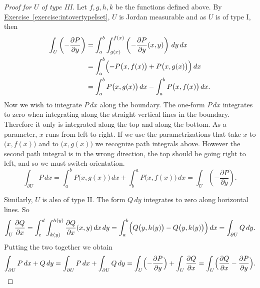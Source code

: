 \documentclass[12pt]{book}
\theoremstyle{plain}
\theoremstyle{remark}
\theoremstyle{definition}
\theoremstyle{exercise}
\theoremstyle{example}
\newcommand{\exerciseref}[1]{\hyperref[#1]{Exercise~\ref*{#1}}}
\begin{document}
\begin{proof}[Proof for $U$ of type III]
Let $f,g,h,k$ be the functions defined above.
By \exerciseref{exercise:intovertypeIset},
$U$ is Jordan measurable and as $U$ is of type I, then
\begin{equation*}
\begin{split}
\int_U 
\left(- \frac{\partial P}{\partial y} \right)
& =
\int_a^b \int_{g(x)}^{f(x)}
\left(- \frac{\partial P}{\partial y} (x,y) \right)
\, dy \, dx 
\\
& =
\int_a^b \Bigl(
- P\bigl(x,f(x)\bigr) +
P\bigl(x,g(x)\bigr)
\Bigr) \, dx
\\
& =
\int_a^b P\bigl(x,g(x)\bigr) \, dx 
-
\int_a^b P\bigl(x,f(x)\bigr) \, dx .
\end{split}
\end{equation*}
Now we wish to integrate $P\,dx$ along the boundary.
The one-form $P\,dx$ integrates to zero when integrating
along the straight vertical lines in the boundary.  Therefore it only is
integrated along the top and along the bottom.  As a parameter,
$x$ runs from left to right.  If we use the parametrizations that take $x$
to $\bigl(x,f(x)\bigr)$ and to
$\bigl(x,g(x)\bigr)$ we recognize path integrals above.  However the second
path integral is in the wrong direction, the top should be going right to
left, and so we must switch orientation.
\begin{equation*}
\int_{\partial U} P \, dx
=
\int_a^b P\bigl(x,g(x)\bigr) \, dx 
+
\int_b^a P\bigl(x,f(x)\bigr) \, dx
=
\int_U 
\left(- \frac{\partial P}{\partial y} \right) .
\end{equation*}

Similarly, $U$ is also of type II.  The form $Q\,dy$ integrates to zero along
horizontal lines.   So
\begin{equation*}
\int_U 
\frac{\partial Q}{\partial x}
=
\int_c^d \int_{k(y)}^{h(y)}
\frac{\partial Q}{\partial x}(x,y)
\, dx \, dy 
=
\int_a^b \Bigl(
Q\bigl(y,h(y)\bigr) 
-
Q\bigl(y,k(y)\bigr)
\Bigr) \, dx 
=
\int_{\partial U} Q \, dy .
\end{equation*}
Putting the two together we obtain
\begin{equation*}
\int_{\partial U} P\, dx + Q \, dy 
=
\int_{\partial U} P\, dx + \int_{\partial U} Q \, dy 
=
\int_U 
\Bigl(-\frac{\partial P}{\partial y}\Bigr)
+
\int_U 
\frac{\partial Q}{\partial x}
=
\int_U 
\Bigl(
\frac{\partial Q}{\partial x}
-\frac{\partial P}{\partial y}
\Bigr) . \qedhere
\end{equation*}
\end{proof}
\end{document}
